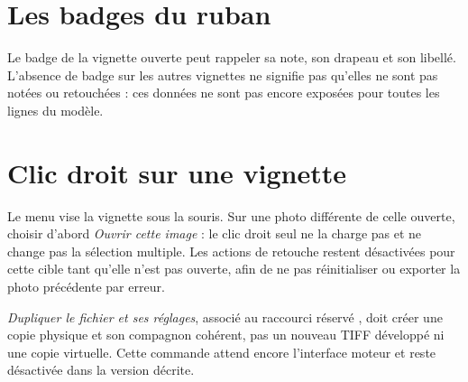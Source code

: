 
\section{Les badges du ruban}
Le badge de la vignette ouverte peut rappeler sa note, son drapeau et son
libellé. L’absence de badge sur les autres vignettes ne signifie pas qu’elles
ne sont pas notées ou retouchées : ces données ne sont pas encore exposées
pour toutes les lignes du modèle.

\section{Clic droit sur une vignette}
Le menu vise la vignette sous la souris. Sur une photo différente de celle
ouverte, choisir d’abord \emph{Ouvrir cette image} : le clic droit seul ne
la charge pas et ne change pas la sélection multiple. Les actions de retouche
restent désactivées pour cette cible tant qu’elle n’est pas ouverte, afin
de ne pas réinitialiser ou exporter la photo précédente par erreur.

\emph{Dupliquer le fichier et ses réglages}, associé au raccourci réservé
, doit créer une copie physique et son compagnon cohérent,
pas un nouveau TIFF développé ni une copie virtuelle. Cette commande attend
encore l’interface moteur et reste désactivée dans la version décrite.
